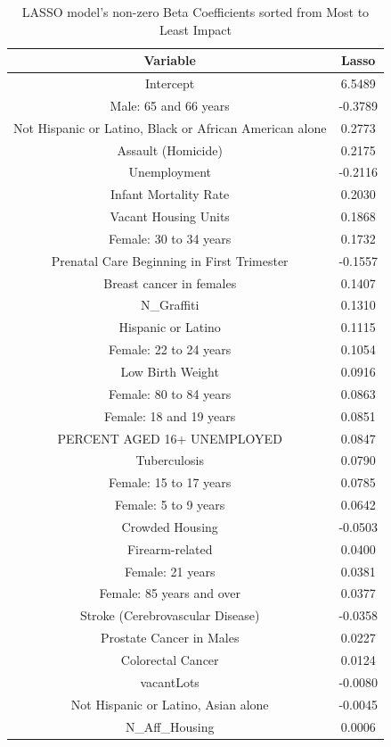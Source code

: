 \documentclass{article} %
\begin{document}
\begin{table}[h]
\centering
\begin{adjustbox}{width = 0.5\textwidth}
\begin{tabular}{cc}
  \hline
Variable & Lasso \\ 
  \hline
Intercept & 6.5489 \\ 
  Male: 65 and 66 years & -0.3789 \\ 
  Not Hispanic or Latino, Black or African American alone & 0.2773 \\ 
  Assault (Homicide) & 0.2175 \\ 
  Unemployment & -0.2116 \\ 
  Infant Mortality Rate & 0.2030 \\ 
  Vacant Housing Units & 0.1868 \\ 
  Female: 30 to 34 years & 0.1732 \\ 
  Prenatal Care Beginning in First Trimester & -0.1557 \\ 
  Breast cancer in females & 0.1407 \\ 
  N\_Graffiti & 0.1310 \\ 
  Hispanic or Latino & 0.1115 \\ 
  Female: 22 to 24 years & 0.1054 \\ 
  Low Birth Weight & 0.0916 \\ 
  Female: 80 to 84 years & 0.0863 \\ 
  Female: 18 and 19 years & 0.0851 \\ 
  PERCENT AGED 16+ UNEMPLOYED & 0.0847 \\ 
  Tuberculosis & 0.0790 \\ 
  Female: 15 to 17 years & 0.0785 \\ 
  Female: 5 to 9 years & 0.0642 \\ 
  Crowded Housing & -0.0503 \\ 
  Firearm-related & 0.0400 \\ 
  Female: 21 years & 0.0381 \\ 
  Female: 85 years and over & 0.0377 \\ 
  Stroke (Cerebrovascular Disease) & -0.0358 \\ 
  Prostate Cancer in Males & 0.0227 \\ 
  Colorectal Cancer & 0.0124 \\ 
  vacantLots & -0.0080 \\ 
  Not Hispanic or Latino, Asian alone & -0.0045 \\ 
  N\_Aff\_Housing & 0.0006 \\ 
   \hline
\end{tabular}
\end{adjustbox}
\caption{LASSO model's non-zero Beta Coefficients sorted from Most to Least Impact}
\label{table:lassoBetaNonZero}
\end{table}
\end{document}
